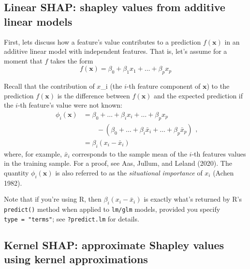 \hypertarget{linear-shap-shapley-values-from-additive-linear-models}{%
\subsection{Linear SHAP: shapley values from additive linear models}\label{linear-shap-shapley-values-from-additive-linear-models}}

First, lets discuss how a feature's value contributes to a prediction \(f\left(\boldsymbol{x}\right)\) in an additive linear model with independent features. That is, let's assume for a moment that \(f\) takes the form
\begin{equation}
\nonumber
  f\left(\boldsymbol{x}\right) = \beta_0 + \beta_1 x_1 + \dots + \beta_p x_p
\end{equation}

Recall that the contribution of \(x\)\_i (the \(i\)-th feature component of \(\boldsymbol{x}\)) to the prediction \(f\left(\boldsymbol{x}\right)\) is the difference between \(f\left(\boldsymbol{x}\right)\) and the expected prediction if the \(i\)-th feature's value were not known:
\begin{equation}
\nonumber
\begin{split}
  \phi_i\left(\boldsymbol{x}\right) &= \beta_0 + \dots + \beta_i x_i + \dots + \beta_p x_p \\ &\quad\quad - \left(\beta_0 + \dots + \beta_i \bar{x}_i + \dots + \beta_p \bar{x}_p\right) \\
  &= \beta_i \left(x_i - \bar{x}_i\right)
\end{split},
\end{equation}
where, for example, \(\bar{x}_i\) corresponds to the sample mean of the \(i\)-th features values in the training sample. For a proof, see Aas, Jullum, and Løland (2020). The quantity \(\phi_i\left(\boldsymbol{x}\right)\) is also referred to as the \emph{situational importance} of \(x_i\) (Achen 1982).

Note that if you're using R, then \(\beta_i \left(x_i - \bar{x}_i\right)\) is exactly what's returned by R's \texttt{predict()} method when applied to \texttt{lm/glm} models, provided you specify \texttt{type\ =\ "terms"}; see \texttt{?predict.lm} for details.

\hypertarget{kernel-shap-approximate-shapley-values-using-kernel-approximations}{%
\subsection{Kernel SHAP: approximate Shapley values using kernel approximations}\label{kernel-shap-approximate-shapley-values-using-kernel-approximations}}

